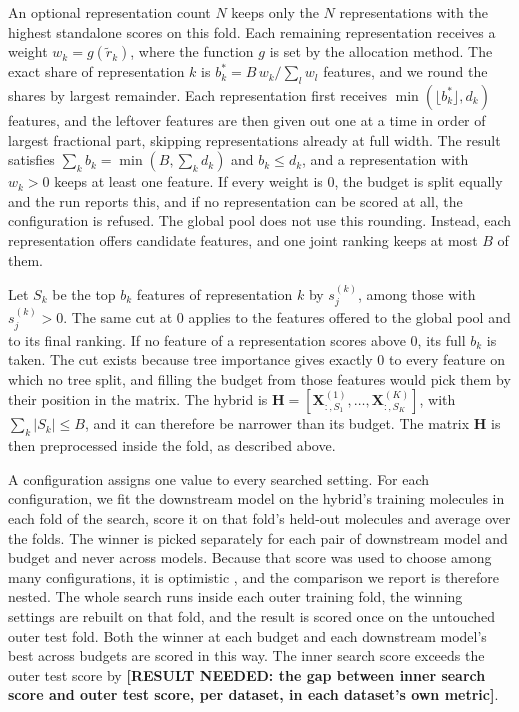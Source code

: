An optional representation count $N$ keeps only the $N$ representations with the highest standalone scores on this fold. Each remaining representation receives a weight $w_k = g(\tilde r_k)$, where the function $g$ is set by the allocation method. The exact share of representation $k$ is $b^*_k = B\, w_k / \sum_l w_l$ features, and we round the shares by largest remainder. Each representation first receives $\min(\lfloor b^*_k \rfloor, d_k)$ features, and the leftover features are then given out one at a time in order of largest fractional part, skipping representations already at full width. The result satisfies $\sum_k b_k = \min(B, \sum_k d_k)$ and $b_k \le d_k$, and a representation with $w_k > 0$ keeps at least one feature. If every weight is 0, the budget is split equally and the run reports this, and if no representation can be scored at all, the configuration is refused. The global pool does not use this rounding. Instead, each representation offers candidate features, and one joint ranking keeps at most $B$ of them.

Let $S_k$ be the top $b_k$ features of representation $k$ by $s^{(k)}_j$, among those with $s^{(k)}_j > 0$. The same cut at 0 applies to the features offered to the global pool and to its final ranking. If no feature of a representation scores above 0, its full $b_k$ is taken. The cut exists because tree importance gives exactly 0 to every feature on which no tree split, and filling the budget from those features would pick them by their position in the matrix. The hybrid is $\mathbf{H} = [\mathbf{X}^{(1)}_{:,S_1}, \dots, \mathbf{X}^{(K)}_{:,S_K}]$, with $\sum_k |S_k| \le B$, and it can therefore be narrower than its budget. The matrix $\mathbf{H}$ is then preprocessed inside the fold, as described above.

A configuration assigns one value to every searched setting. For each configuration, we fit the downstream model on the hybrid's training molecules in each fold of the search, score it on that fold's held-out molecules and average over the folds. The winner is picked separately for each pair of downstream model and budget and never across models. Because that score was used to choose among many configurations, it is optimistic \citep{Varma2006, Cawley2010}, and the comparison we report is therefore nested. The whole search runs inside each outer training fold, the winning settings are rebuilt on that fold, and the result is scored once on the untouched outer test fold. Both the winner at each budget and each downstream model's best across budgets are scored in this way. The inner search score exceeds the outer test score by \textbf{[RESULT NEEDED: the gap between inner search score and outer test score, per dataset, in each dataset's own metric]}.

